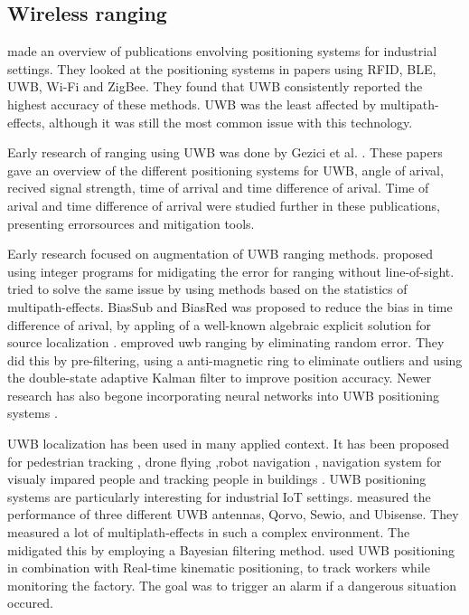 \subsection{Wireless ranging}

\cite{li2024indoor} made an overview of publications envolving positioning systems for industrial settings. 
They looked at the positioning systems in papers using RFID, BLE, UWB, Wi-Fi and ZigBee. They found that UWB consistently reported the highest accuracy of these methods.
UWB was the least affected by multipath-effects, although it was still the most common issue with this technology.


Early research of ranging using UWB was done by Gezici et al. \cite{gezici2008survey, gezici2005localization}.
These papers gave an overview of the different positioning systems for UWB, angle of arival, recived signal strength, time of arrival and time difference of arival.
Time of arival and time difference of arrival were studied further in these publications, presenting errorsources and mitigation tools.


Early research focused on augmentation of UWB ranging methods.
\cite{venkatesh2007nlos} proposed using integer programs for midigating the error for ranging without line-of-sight.
\cite{guvencc2007nlos} tried to solve the same issue by using methods based on the statistics of multipath-effects.
BiasSub and BiasRed was proposed to reduce the bias in time difference of arival, by appling of a well-known algebraic explicit solution for source localization  \cite{ho2012bias}.
\cite{fan2017performance} emproved uwb ranging by eliminating random error. They did this by pre-filtering, using a anti-magnetic ring to eliminate outliers and using the double-state adaptive Kalman filter to improve position accuracy.
Newer research has also begone incorporating neural networks into UWB positioning systems \cite{stahlke2020nlos, ridolfi2021uwb, che2020machine}.

UWB localization has been used in many applied context.
It has been proposed for pedestrian tracking \cite{otim2019effects}, drone flying \cite{macoir2019uwb},robot navigation \cite{zhu2020adapted}, navigation system for visualy impared people \cite{rosiak2024effectiveness} and tracking people in buildings \cite{elbaum2024investigating}.
UWB positioning systems are particularly interesting for industrial IoT settings.
\cite{barbieri2021uwb} measured the performance of three different UWB antennas, Qorvo, Sewio, and Ubisense. They measured a lot of multiplath-effects in such a complex environment. The midigated this by employing a Bayesian filtering method.
\cite{belli2024cloud} used UWB positioning in combination with Real-time kinematic positioning, to track workers while monitoring the factory. The goal was to trigger an alarm if a dangerous situation occured.
